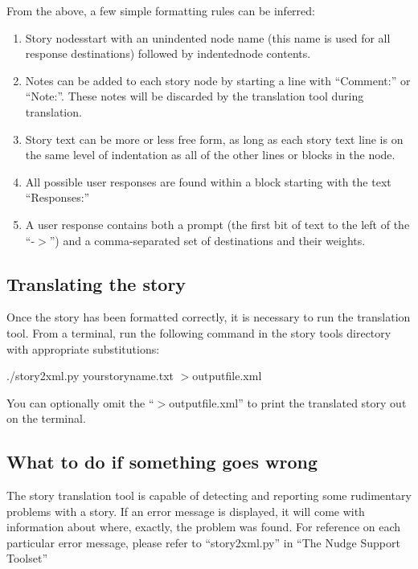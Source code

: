\documentclass[12pt,letterpaper]{article}
\begin{document}
From the above, a few simple formatting rules can be inferred:
\begin{enumerate}
 \item Story nodes\footnotemark[1] start with an unindented node name (this name is used for all response destinations) followed by indented\footnotemark[2] node contents.
 \item Notes can be added to each story node by starting a line with ``Comment:'' or ``Note:''. These notes will be discarded by the translation tool during translation.
 \item Story text can be more or less free form, as long as each story text line is on the same level of indentation as all of the other lines or blocks in the node.
 \item All possible user responses are found within a block starting with the text ``Responses:''
 \item A user response contains both a prompt (the first bit of text to the left of the ``-$>$'') and a comma-separated set of destinations and their weights.
\end{enumerate}


\subsection{Translating the story}
Once the story has been formatted correctly, it is necessary to run the translation tool. From a terminal, run the following command 
in the story tools directory with appropriate substitutions:

\begin{center}
./story2xml.py yourstoryname.txt $>$outputfile.xml
\end{center}

You can optionally omit the ``$>$outputfile.xml'' to print the translated story out on the terminal.

\subsection{What to do if something goes wrong}
The story translation tool is capable of detecting and reporting some rudimentary problems with a story. If an error message is displayed, it will come
with information about where, exactly, the problem was found. For reference on each particular error message, please refer to ``story2xml.py'' in ``The 
Nudge Support Toolset''
\end{document}
